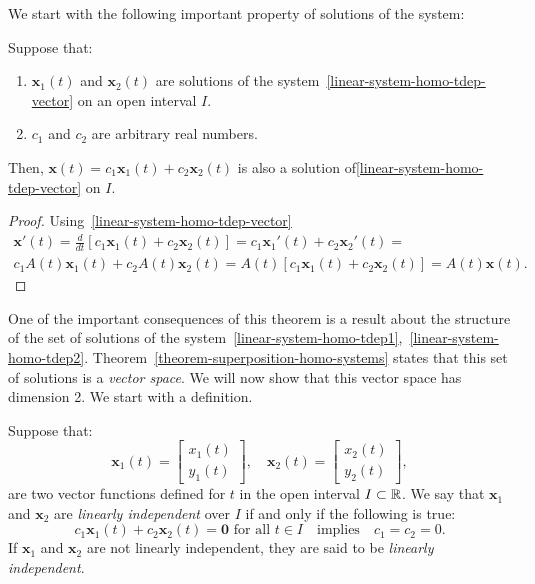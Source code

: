 We start with the following important property of solutions of the system:

\begin{theorem}
\label{theorem-superposition-homo-systems}
Suppose that: 
\begin{enumerate}
\item $\mathbf{x}_1(t)$ and $\mathbf{x}_2(t)$ are solutions of the system~\eqref{linear-system-homo-tdep-vector} on an open interval $I$.
\item $c_1$ and $c_2$ are arbitrary real numbers.
\end{enumerate}
Then, $\mathbf{x}(t)=c_1\mathbf{x}_1(t)+c_2\mathbf{x}_2(t)$ is also a solution of\eqref{linear-system-homo-tdep-vector} on $I$.
\end{theorem}

\begin{proof} Using~\eqref{linear-system-homo-tdep-vector}
\begin{multline*}
\mathbf{x}'(t)=\frac{d}{dt}\left[c_1\mathbf{x}_1(t)+c_2\mathbf{x}_2(t)\right]=
c_1\mathbf{x}_1'(t)+c_2\mathbf{x}_2'(t)=\\
c_1A(t)\mathbf{x}_1(t)+c_2A(t)\mathbf{x}_2(t)
=A(t)\left[c_1\mathbf{x}_1(t)+c_2\mathbf{x}_2(t)\right]=A(t)\mathbf{x}(t).
\end{multline*}
\end{proof}

One of the important consequences of this theorem is a result about the structure of the set of solutions of the system~\eqref{linear-system-homo-tdep1},~\eqref{linear-system-homo-tdep2}. Theorem~\ref{theorem-superposition-homo-systems} states that this set of solutions is a \emph{vector space}. We will now show that this vector space has dimension 2. We start with a definition.

\begin{definition} Suppose that:
\[
\mathbf{x}_1(t)=\begin{bmatrix}x_1(t)\\y_1(t)\end{bmatrix},\quad
\mathbf{x}_2(t)=\begin{bmatrix}x_2(t)\\y_2(t)\end{bmatrix},
\]
are two vector functions defined for $t$ in the open interval $I\subset\mathbb{R}$. We say that $\mathbf{x}_1$ and $\mathbf{x}_2$ are \emph{linearly independent} over $I$ if and only if the following is true:
\[
c_1\mathbf{x}_1(t)+c_2\mathbf{x}_2(t)=\mathbf{0}\text{ for all $t\in I$}\quad\text{implies}\quad c_1=c_2=0.
\]
If $\mathbf{x}_1$ and $\mathbf{x}_2$ are not linearly independent, they are said to be \emph{linearly independent}.
\end{definition}

